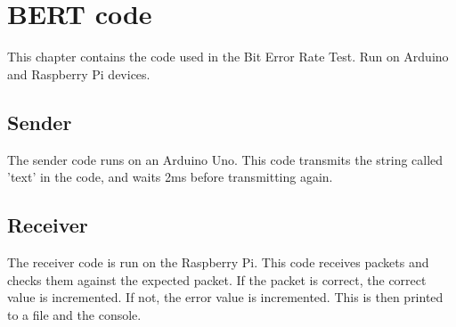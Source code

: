 \chapter{BERT code}\label{cha:bertcode}
This chapter contains the code used in the Bit Error Rate Test. Run on Arduino and Raspberry Pi devices.

\section{Sender}
The sender code runs on an Arduino Uno. This code transmits the string called 'text' in the code, and waits 2ms before transmitting again.


\section{Receiver}
The receiver code is run on the Raspberry Pi. This code receives packets and checks them against the expected packet. If the packet is correct, the correct value is incremented. If not, the error value is incremented. This is then printed to a file and the console.
